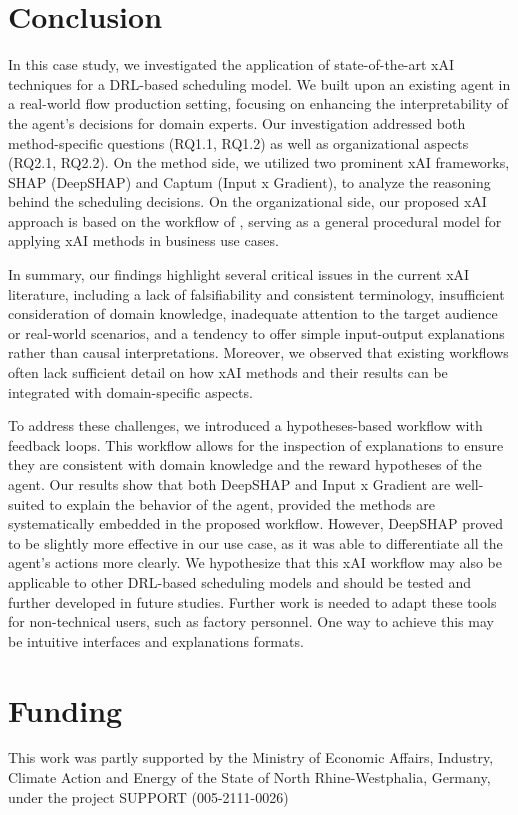 \section{Conclusion}
In this case study, we investigated the application of state-of-the-art xAI techniques for a DRL-based scheduling model. We built upon an existing agent in a real-world flow production setting, focusing on enhancing the interpretability of the agent's decisions for domain experts. Our investigation addressed both method-specific questions (RQ1.1, RQ1.2) as well as organizational aspects (RQ2.1, RQ2.2). On the method side, we utilized two prominent xAI frameworks, SHAP (DeepSHAP) and Captum (Input x Gradient), to analyze the reasoning behind the scheduling decisions. On the organizational side, our proposed xAI approach is based on the workflow of , serving as a general procedural model for applying xAI methods in business use cases.

In summary, our findings highlight several critical issues in the current xAI literature, including a lack of falsifiability and consistent terminology, insufficient consideration of domain knowledge, inadequate attention to the target audience or real-world scenarios, and a tendency to offer simple input-output explanations rather than causal interpretations. Moreover, we observed that existing workflows often lack sufficient detail on how xAI methods and their results can be integrated with domain-specific aspects.

To address these challenges, we introduced a hypotheses-based workflow with feedback loops. This workflow allows for the inspection of explanations to ensure they are consistent with domain knowledge and the reward hypotheses of the agent. Our results show that both DeepSHAP and Input x Gradient are well-suited to explain the behavior of the agent, provided the methods are systematically embedded in the proposed workflow. However, DeepSHAP proved to be slightly more effective in our use case, as it was able to differentiate all the agent's actions more clearly. We hypothesize that this xAI workflow may also be applicable to other DRL-based scheduling models and should be tested and further developed in future studies. Further work is needed to adapt these tools for non-technical users, such as factory personnel. One way to achieve this may be intuitive interfaces and explanations formats.



\section*{Funding}
This work was partly supported by the Ministry of Economic Affairs,
Industry, Climate Action and Energy of the State of North Rhine-Westphalia,
Germany, under the project SUPPORT (005-2111-0026)

